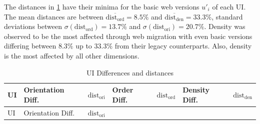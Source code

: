 The distances in \cref{tbl:ci:distances} have their minima for the basic web versions \(u'_i\) of each UI.
The mean distances are between \(\overline{\text{dist}_{\text{ord}}}=8.5\%\) and \(\overline{\text{dist}_{\text{den}}}=33.3\%\), standard deviations between \(\sigma(\text{dist}_{\text{ord}})=13.7\%\) and \(\sigma(\text{dist}_{\text{ori}})=20.7\%\).
Density was observed to be the most affected through web migration with even basic versions differing between \(8.3\%\) up to \(33.3\%\) from their legacy counterparts.
Also, density is the most affected by all other dimensions.

\hypertarget{tbl:ci:distances}{}
\begin{longtable}[]{@{}lllllll@{}}
\caption{\label{tbl:ci:distances}UI Differences and distances}\tabularnewline
\toprule
\begin{minipage}[b]{0.13\columnwidth}\raggedright
UI\strut
\end{minipage} & \begin{minipage}[b]{0.10\columnwidth}\raggedright
Orientation Diff.\strut
\end{minipage} & \begin{minipage}[b]{0.15\columnwidth}\raggedright
\(\text{dist}_{\text{ori}}\)\strut
\end{minipage} & \begin{minipage}[b]{0.06\columnwidth}\raggedright
Order Diff.\strut
\end{minipage} & \begin{minipage}[b]{0.15\columnwidth}\raggedright
\(\text{dist}_{\text{ord}}\)\strut
\end{minipage} & \begin{minipage}[b]{0.07\columnwidth}\raggedright
Density Diff.\strut
\end{minipage} & \begin{minipage}[b]{0.15\columnwidth}\raggedright
\(\text{dist}_{\text{den}}\)\strut
\end{minipage}\tabularnewline
\midrule
\endfirsthead
\toprule
\begin{minipage}[b]{0.13\columnwidth}\raggedright
UI\strut
\end{minipage} & \begin{minipage}[b]{0.10\columnwidth}\raggedright
Orientation Diff.\strut
\end{minipage} & \begin{minipage}[b]{0.15\columnwidth}\raggedright
\(\text{dist}_{\text{ori}}\)\strut
\end{minipage} & \begin{minipage}[b]{0.06\columnwidth}\raggedright

\end{minipage}
\end{longtable}
